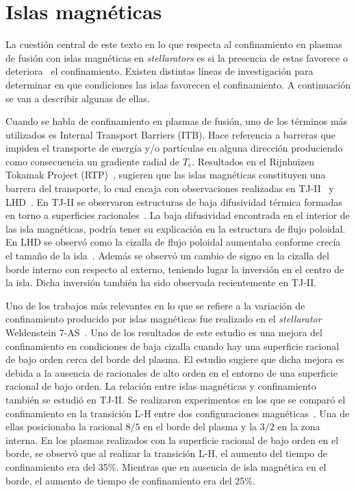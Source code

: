 \section{Islas magnéticas}
La cuestión central de este texto en lo que respecta al confinamiento en plasmas de fusión con
islas magnéticas en \textit{stellarators} es si la presencia de estas favorece o deteriora~\cite{Transport_1999} el confinamiento.
Existen distintas líneas de investigación para determinar en que condiciones las islas
favorecen el confinamiento. A continuación se van a describir algunas de ellas.\par
Cuando se habla de confinamiento en plasmas de fusión, uno de los términos más utilizados
es Internal Transport Barriers (ITB). Hace referencia a barreras
que impiden el transporte de energía y/o partículas en alguna dirección produciendo como
consecuencia un gradiente radial de $T_e$.
Resultados en el Rijnhuizen Tokamak Project (RTP)~\cite{PhysRevLett.82.5048}, sugieren que las islas 
magnéticas constituyen una barrera
del transporte, lo cual encaja con observaciones realizadas en TJ-II~\cite{Castej_n_2004,Estrada_2003} y 
LHD~\cite{PhysRevLett.84.103}. 
En TJ-II se observaron estructuras de baja difusividad térmica formadas en torno a superficies
racionales~\cite{Vargas_2007,Estrada_2007}.
La baja difusividad encontrada en el interior de las isla magnéticas, podría tener su explicación 
en la estructura de flujo poloidal. En LHD se observó como la cizalla de flujo poloidal
aumentaba conforme crecía el tamaño de la isla~\cite{PhysRevLett.88.015002}. 
Además se observó un cambio de signo en
la cizalla del borde interno con respecto al externo, teniendo lugar la inversión en el centro de
la isla. Dicha inversión también ha sido observada recientemente en TJ-II.\par
Uno de los trabajos más relevantes en lo que se refiere a la variación de confinamiento
producido por islas magnéticas fue realizado en el \textit{stellarator} Weldenstein 7-AS~\cite{Brakel_2002}. 
Uno de los resultados de este estudio es una mejora del confinamiento en
condiciones de baja cizalla cuando hay una superficie racional de bajo orden cerca del borde
del plasma. El estudio sugiere que dicha mejora es debida a la ausencia de racionales de alto
orden en el entorno de una superficie racional de bajo orden.
La relación entre islas magnéticas y confinamiento también se estudió en TJ-II. Se realizaron
experimentos en los que se comparó el confinamiento en la transición L-H entre dos
configuraciones magnéticas~\cite{Estrada_2009}. 
Una de ellas posicionaba la racional $8/5$ en el borde del plasma
y la $3/2$ en la zona interna. En los plasmas realizados con la superficie racional de bajo
orden en el borde, se observó que al realizar la transición L-H, el aumento del tiempo de
confinamiento era del 35\%. Mientras que en ausencia de isla magnética en el borde, 
el aumento de tiempo de confinamiento era del 25\%.
